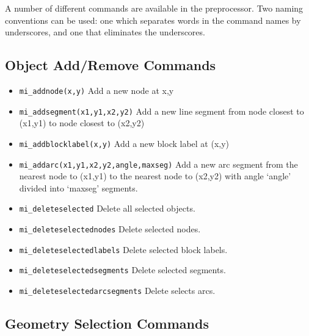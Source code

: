 A number of different commands are available in the preprocessor.
Two naming conventions can be used: one which separates words in
the command names by underscores, and one that eliminates the
underscores.

\subsection{Object Add/Remove Commands}

\begin{itemize}

\item{\tt mi\_addnode(x,y)} Add a new node at x,y

\item{\tt mi\_addsegment(x1,y1,x2,y2)} Add a new line segment from node
closest to (x1,y1) to node closest to (x2,y2)

\item{\tt mi\_addblocklabel(x,y)} Add a new block label at (x,y)

\item{\tt mi\_addarc(x1,y1,x2,y2,angle,maxseg)} Add a new arc segment
from the nearest node to (x1,y1) to the nearest node to (x2,y2)
with angle `angle' divided into `maxseg' segments.

\item{\tt mi\_deleteselected} Delete all selected objects.

\item{\tt mi\_deleteselectednodes} Delete selected nodes.

\item{\tt mi\_deleteselectedlabels} Delete selected block labels.

\item{\tt mi\_deleteselectedsegments} Delete selected segments.

\item{\tt mi\_deleteselectedarcsegments} Delete selects arcs.
\end{itemize}

\subsection{Geometry Selection Commands}

